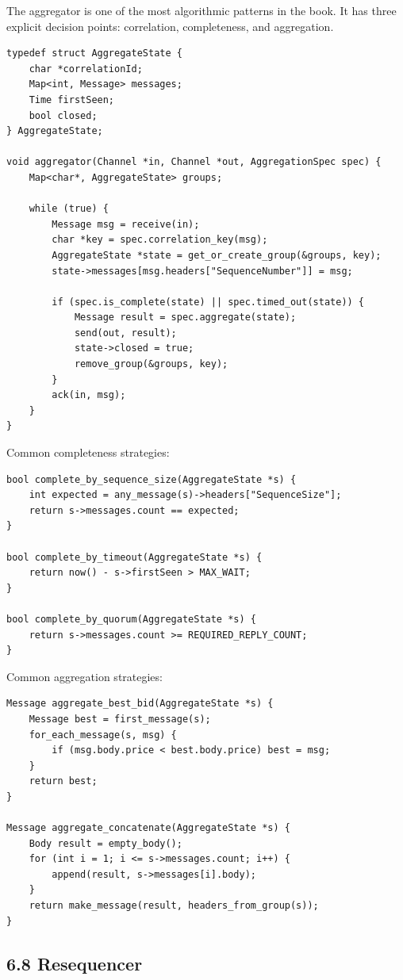 \documentclass[11pt]{article}
\begin{document}
The aggregator is one of the most algorithmic patterns in the book. It
has three explicit decision points: correlation, completeness, and
aggregation.

\begin{verbatim}
typedef struct AggregateState {
    char *correlationId;
    Map<int, Message> messages;
    Time firstSeen;
    bool closed;
} AggregateState;

void aggregator(Channel *in, Channel *out, AggregationSpec spec) {
    Map<char*, AggregateState> groups;

    while (true) {
        Message msg = receive(in);
        char *key = spec.correlation_key(msg);
        AggregateState *state = get_or_create_group(&groups, key);
        state->messages[msg.headers["SequenceNumber"]] = msg;

        if (spec.is_complete(state) || spec.timed_out(state)) {
            Message result = spec.aggregate(state);
            send(out, result);
            state->closed = true;
            remove_group(&groups, key);
        }
        ack(in, msg);
    }
}
\end{verbatim}

Common completeness strategies:

\begin{verbatim}
bool complete_by_sequence_size(AggregateState *s) {
    int expected = any_message(s)->headers["SequenceSize"];
    return s->messages.count == expected;
}

bool complete_by_timeout(AggregateState *s) {
    return now() - s->firstSeen > MAX_WAIT;
}

bool complete_by_quorum(AggregateState *s) {
    return s->messages.count >= REQUIRED_REPLY_COUNT;
}
\end{verbatim}

Common aggregation strategies:

\begin{verbatim}
Message aggregate_best_bid(AggregateState *s) {
    Message best = first_message(s);
    for_each_message(s, msg) {
        if (msg.body.price < best.body.price) best = msg;
    }
    return best;
}

Message aggregate_concatenate(AggregateState *s) {
    Body result = empty_body();
    for (int i = 1; i <= s->messages.count; i++) {
        append(result, s->messages[i].body);
    }
    return make_message(result, headers_from_group(s));
}
\end{verbatim}

\subsection{6.8 Resequencer}\label{resequencer}
\end{document}
